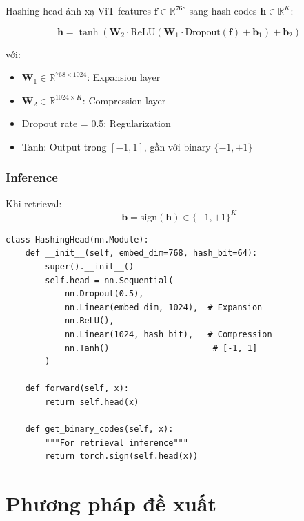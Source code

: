 \documentclass[12pt,a4paper]{article}
\begin{document}
Hashing head ánh xạ ViT features $\mathbf{f} \in \mathbb{R}^{768}$ sang hash codes $\mathbf{h} \in \mathbb{R}^{K}$:

\begin{equation}
    \mathbf{h} = \tanh(\mathbf{W}_2 \cdot \text{ReLU}(\mathbf{W}_1 \cdot \text{Dropout}(\mathbf{f}) + \mathbf{b}_1) + \mathbf{b}_2)
\end{equation}

với:
\begin{itemize}
    \item $\mathbf{W}_1 \in \mathbb{R}^{768 \times 1024}$: Expansion layer
    \item $\mathbf{W}_2 \in \mathbb{R}^{1024 \times K}$: Compression layer
    \item Dropout rate = 0.5: Regularization
    \item Tanh: Output trong $[-1, 1]$, gần với binary $\{-1, +1\}$
\end{itemize}

\subsubsection{Inference}

Khi retrieval:
\begin{equation}
    \mathbf{b} = \text{sign}(\mathbf{h}) \in \{-1, +1\}^K
\end{equation}

\begin{lstlisting}[caption={Hashing Head Implementation}]
class HashingHead(nn.Module):
    def __init__(self, embed_dim=768, hash_bit=64):
        super().__init__()
        self.head = nn.Sequential(
            nn.Dropout(0.5),
            nn.Linear(embed_dim, 1024),  # Expansion
            nn.ReLU(),
            nn.Linear(1024, hash_bit),   # Compression
            nn.Tanh()                     # [-1, 1]
        )
    
    def forward(self, x):
        return self.head(x)
    
    def get_binary_codes(self, x):
        """For retrieval inference"""
        return torch.sign(self.head(x))
\end{lstlisting}

\section{Phương pháp đề xuất}
\end{document}
